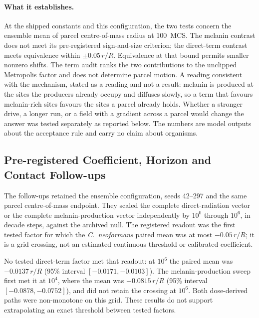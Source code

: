 \documentclass[11pt]{article}
\begin{document}
\paragraph{What it establishes.} At the shipped constants and this configuration, the two tests
concern the ensemble mean of parcel centre-of-mass radius at 100~MCS. The melanin contrast does
not meet its pre-registered sign-and-size criterion; the direct-term contrast meets equivalence
within $\pm0.05\,r/R$. Equivalence at that bound permits smaller nonzero shifts. The term audit
ranks the two contributions to the unclipped Metropolis factor and does not determine parcel motion.
A reading consistent with the mechanism, stated as a reading and not a result: melanin is
produced at the sites the producers already occupy and diffuses slowly, so a term that favours
melanin-rich sites favours the sites a parcel already holds. Whether a stronger drive, a longer
run, or a field with a gradient across a parcel would change the answer was tested separately as
reported below. The numbers are model outputs about the acceptance rule and carry no claim about
organisms.

\subsection{Pre-registered Coefficient, Horizon and Contact Follow-ups}
\label{sec:followups}

The follow-ups retained the ensemble configuration, seeds 42--297 and the same parcel
centre-of-mass endpoint. They scaled the complete direct-radiation vector or the complete
melanin-production vector independently by $10^0$ through $10^6$, in decade steps, against the
archived null. The registered readout was the first tested factor for which the
\textit{C.~neoformans} paired mean was at most $-0.05\,r/R$; it is a grid crossing, not an estimated
continuous threshold or calibrated coefficient.

No tested direct-term factor met that readout: at $10^6$ the paired mean was
$-0.0137\,r/R$ (95\% interval $[-0.0171,-0.0103]$). The melanin-production sweep first met it at
$10^4$, where the mean was $-0.0815\,r/R$ (95\% interval $[-0.0878,-0.0752]$), and did not retain
the crossing at $10^6$. Both dose-derived paths were non-monotone on this grid. These results do
not support extrapolating an exact threshold between tested factors.
\end{document}
